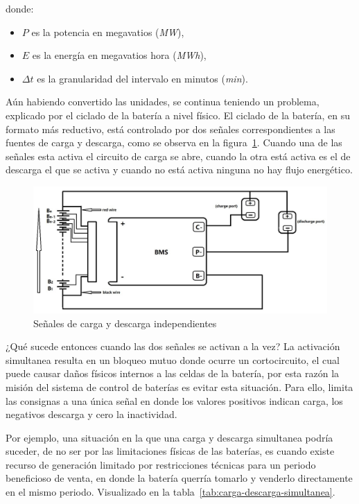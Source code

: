 donde:

\begin{itemize}

\item \( P \) es la potencia en megavatios (\textit{MW}),

\item \( E \) es la energía en megavatios hora (\textit{MWh}),

\item \( \Delta t \) es la granularidad del intervalo en minutos (\textit{min}).

\end{itemize}

Aún habiendo convertido las unidades, se continua teniendo un problema, explicado por el ciclado de la batería a nivel físico. El ciclado de la batería, en su formato más reductivo, está controlado por dos señales correspondientes a las fuentes de carga y descarga, como se observa en la figura~\ref{fig:carga-descarga}. Cuando una de las señales esta activa el circuito de carga se abre, cuando la otra está activa es el de descarga el que se activa y cuando no está activa ninguna no hay flujo energético.

\begin{figure}
\centering
\includegraphics[width=0.5\linewidth]{figures/carga-descarga.png}
\caption{Señales de carga y descarga independientes}
\label{fig:carga-descarga}
\end{figure}

¿Qué sucede entonces cuando las dos señales se activan a la vez? La activación simultanea resulta en un bloqueo mutuo donde ocurre un cortocircuito, el cual puede causar daños físicos internos a las celdas de la batería, por esta razón la misión del sistema de control de baterías es evitar esta situación. Para ello, limita las consignas a una única señal en donde los valores positivos indican carga, los negativos descarga y cero la inactividad.

Por ejemplo, una situación en la que una carga y descarga simultanea podría suceder, de no ser por las limitaciones físicas de las baterías, es cuando existe recurso de generación limitado por restricciones técnicas para un periodo beneficioso de venta, en donde la batería querría tomarlo y venderlo directamente en el mismo periodo. Visualizado en la tabla~\ref{tab:carga-descarga-simultanea}.

